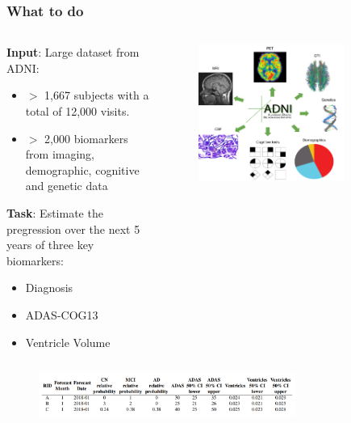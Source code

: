 \documentclass[8pt,xcolor=table]{beamer}
\begin{document}
\begin{frame}
\frametitle{What to do}

\begin{columns}[T]
\begin{column}{.55\textwidth}
\textbf{Input}: Large dataset from ADNI:
\begin{itemize}
 \item $>$ 1,667 subjects with a total of 12,000 visits.
 \item $>$ 2,000 biomarkers from imaging, demographic, cognitive and genetic data
\end{itemize}

\vspace{8em}

\textbf{Task}: Estimate the pregression over the next 5 years of three key biomarkers:
\begin{itemize}
 \item Diagnosis   
 \item ADAS-COG13
 \item Ventricle Volume
\end{itemize}

\end{column}
\begin{column}{.45\textwidth}
\begin{figure}
 \centering
 \vspace{-2em}
\includegraphics[width=0.8\textwidth]{../tadpole_data_types}

\end{figure}

\end{column}
\end{columns}

\vspace{-6em}
\begin{figure}[H]
\includegraphics[width=0.75\textwidth,right]{forecasts_table} 
\end{figure}

\end{frame}
\end{document}

